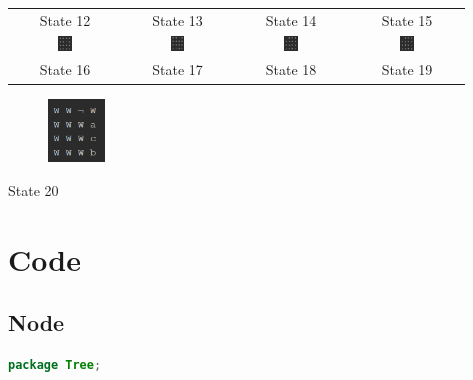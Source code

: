 \documentclass{article}
\begin{document}
\begin{appendices}
\begin{center}
\begin{tabular}{c c c c}
				State 12 & State 13 & State 14 & State 15 \\
				\includegraphics[width=0.135\textwidth,keepaspectratio]{State-16.png} & \includegraphics[width=0.135\textwidth,keepaspectratio]{State-17.png} & \includegraphics[width=0.135\textwidth,keepaspectratio]{State-18.png} & \includegraphics[width=0.135\textwidth,keepaspectratio]{State-19.png} \\
				State 16 & State 17 & State 18 & State 19
			\end{tabular}
		
			\begin{figure}[h]	
				\centering
				\includegraphics[width=0.135\textwidth,keepaspectratio]{State-20.png}
			\end{figure} 
			State 20
		\end{center}
	
		\newpage
		\section{Code}
		\label{appendix:code}
		
		\subsection{Node}
\begin{lstlisting}[language=Java]
package Tree;


\end{lstlisting}
\end{appendices}
\end{document}
